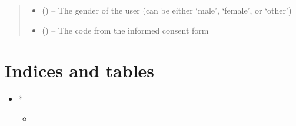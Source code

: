 \documentclass[letterpaper,10pt,english]{sphinxmanual}
\begin{document}
\begin{fulllineitems}
\begin{fulllineitems}
\begin{quote}
\begin{description}
\begin{itemize}
\item {} 
 (\href{https://docs.python.org/2/library/string.html\#module-string}{}) -- The gender of the user (can be either `male', `female', or `other')

\item {} 
 (\href{https://docs.python.org/2/library/string.html\#module-string}{}) -- The code from the informed consent form

\end{itemize}

\end{description}\end{quote}

\end{fulllineitems}


\end{fulllineitems}



\chapter{Indices and tables}
\label{\detokenize{index:indices-and-tables}}\begin{itemize}
\item {} 
* 
\begin{itemize}
\item {} 

\end{itemize}

\end{itemize}
\end{document}
